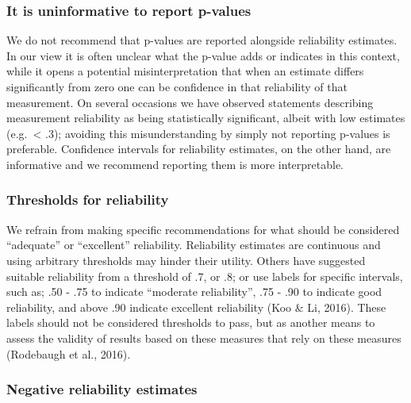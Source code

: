 \documentclass[english,,man,floatsintext]{apa6}
\begin{document}
\hypertarget{it-is-uninformative-to-report-p-values}{%
\subsubsection{It is uninformative to report p-values}\label{it-is-uninformative-to-report-p-values}}

We do not recommend that p-values are reported alongside reliability estimates. In our view it is often unclear what the p-value adds or indicates in this context, while it opens a potential misinterpretation that when an estimate differs significantly from zero one can be confidence in that reliability of that measurement. On several occasions we have observed statements describing measurement reliability as being statistically significant, albeit with low estimates (e.g.~\textless{} .3); avoiding this misunderstanding by simply not reporting p-values is preferable. Confidence intervals for reliability estimates, on the other hand, are informative and we recommend reporting them is more interpretable.

\hypertarget{thresholds-for-reliability}{%
\subsubsection{Thresholds for reliability}\label{thresholds-for-reliability}}

We refrain from making specific recommendations for what should be considered \enquote{adequate} or \enquote{excellent} reliability. Reliability estimates are continuous and using arbitrary thresholds may hinder their utility. Others have suggested suitable reliability from a threshold of .7, or .8; or use labels for specific intervals, such as; .50 - .75 to indicate \enquote{moderate reliability}, .75 - .90 to indicate good reliability, and above .90 indicate excellent reliability (Koo \& Li, 2016). These labels should not be considered thresholds to pass, but as another means to assess the validity of results based on these measures that rely on these measures (Rodebaugh et al., 2016).

\hypertarget{negative-reliability-estimates}{%
\subsubsection{Negative reliability estimates}\label{negative-reliability-estimates}}
\end{document}
